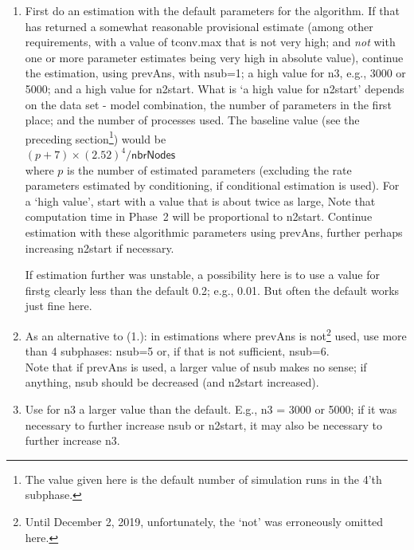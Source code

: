 \documentclass[a4paper,fleqn,11pt]{article}
\newcommand{\+}{\, + \,}
\newcommand{\sfn}[1]{\textsf{#1}}
\begin{document}
\begin{enumerate}
\item First do an estimation with the default parameters
    for the algorithm.
    If that has returned a somewhat reasonable provisional estimate
    (among other requirements, with a value of \sfn{tconv.max} that is
    not very high; and \emph{not} with one or more parameter estimates
    being very high in absolute value), continue the estimation, using \sfn{prevAns},
    with \sfn{nsub=1}; a high value for \sfn{n3}, e.g., 3000 or 5000;
    and a high value for \sfn{n2start}.
    What is `a high value for \sfn{n2start}' depends on the data set
    - model combination,
    the number of parameters in the first place;
    and the number of processes used.
    The baseline value (see the preceding section\footnote{The value given here
    is the default number of simulation runs in the 4'th subphase.})
    would be \\
    $(p+7)\times (2.52)^4 / \sfn{nbrNodes}$ \\
    where $p$ is the
    number of estimated parameters (excluding the rate parameters
    estimated by conditioning, if conditional estimation is used).
    For a `high value', start with a value that is about twice as large,
    Note that computation time in Phase~2 will be proportional to \sfn{n2start}.
    Continue estimation with these algorithmic parameters using \sfn{prevAns},
    further perhaps increasing \sfn{n2start} if necessary.

    If estimation further was unstable, a possibility here is to
    use a value for \sfn{firstg} clearly less than the default 0.2; e.g., 0.01.
    But often the default works just fine here.
\item As an alternative to (1.): in estimations where \sfn{prevAns} is
    not\footnote{Until December 2, 2019, unfortunately, the `not'
    was erroneously omitted here.} used,
    use more than 4 subphases: \sfn{nsub=5} or, if that is not sufficient,
    \sfn{nsub=6}.\\
    Note that if \sfn{prevAns} is used, a larger value of \sfn{nsub}
    makes no sense; if anything, \sfn{nsub} should be decreased
    (and \sfn{n2start} increased).
\item Use for \sfn{n3} a larger value than the default.
    E.g., \sfn{n3 = 3000} or \sfn{5000};
    if it was necessary to further increase \sfn{nsub} or \sfn{n2start}, it may also be
    necessary to further increase \sfn{n3}.
\end{enumerate}
\end{document}
